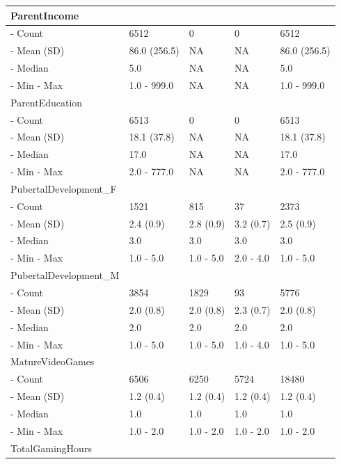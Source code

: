 \documentclass{article}
\begin{document}
\begin{table}
\begin{tabular}[t]{>{}l||>{}l||>{}l||>{}l||l}
\hline
ParentIncome &  &  &  & \\
\hline
-  Count & 6512 & 0 & 0 & 6512\\
\hline
-  Mean (SD) & 86.0 (256.5) & NA & NA & 86.0 (256.5)\\
\hline
-  Median & 5.0 & NA & NA & 5.0\\
\hline
-  Min -
                                                 Max & 1.0 - 999.0 & NA & NA & 1.0 - 999.0\\
\hline
ParentEducation &  &  &  & \\
\hline
-  Count & 6513 & 0 & 0 & 6513\\
\hline
-  Mean (SD) & 18.1 (37.8) & NA & NA & 18.1 (37.8)\\
\hline
-  Median & 17.0 & NA & NA & 17.0\\
\hline
-  Min -
                                                 Max & 2.0 - 777.0 & NA & NA & 2.0 - 777.0\\
\hline
PubertalDevelopment\_F &  &  &  & \\
\hline
-  Count & 1521 & 815 & 37 & 2373\\
\hline
-  Mean (SD) & 2.4 (0.9) & 2.8 (0.9) & 3.2 (0.7) & 2.5 (0.9)\\
\hline
-  Median & 3.0 & 3.0 & 3.0 & 3.0\\
\hline
-  Min -
                                                 Max & 1.0 - 5.0 & 1.0 - 5.0 & 2.0 - 4.0 & 1.0 - 5.0\\
\hline
PubertalDevelopment\_M &  &  &  & \\
\hline
-  Count & 3854 & 1829 & 93 & 5776\\
\hline
-  Mean (SD) & 2.0 (0.8) & 2.0 (0.8) & 2.3 (0.7) & 2.0 (0.8)\\
\hline
-  Median & 2.0 & 2.0 & 2.0 & \vphantom{1} 2.0\\
\hline
-  Min -
                                                 Max & 1.0 - 5.0 & 1.0 - 5.0 & 1.0 - 4.0 & 1.0 - 5.0\\
\hline
MatureVideoGames &  &  &  & \\
\hline
-  Count & 6506 & 6250 & 5724 & 18480\\
\hline
-  Mean (SD) & 1.2 (0.4) & 1.2 (0.4) & 1.2 (0.4) & 1.2 (0.4)\\
\hline
-  Median & 1.0 & 1.0 & 1.0 & \vphantom{2} 1.0\\
\hline
-  Min -
                                                 Max & 1.0 - 2.0 & 1.0 - 2.0 & 1.0 - 2.0 & 1.0 - 2.0\\
\hline
TotalGamingHours &  &  &  & \\

\end{tabular}
\end{table}
\end{document}
